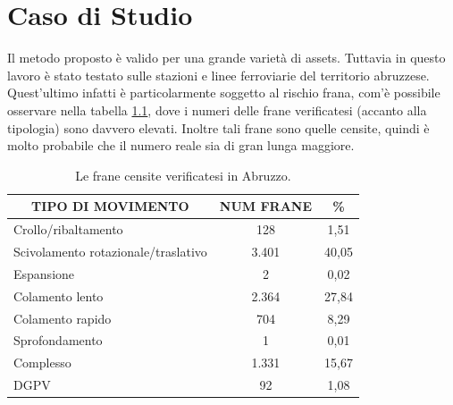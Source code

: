 
\chapter{Caso di Studio} %
Il metodo proposto è valido per una grande varietà di assets. Tuttavia in questo lavoro è stato testato sulle stazioni e linee ferroviarie del territorio abruzzese. Quest'ultimo infatti è particolarmente soggetto al rischio frana, com'è possibile osservare nella tabella \ref{tab:riassunto_frane}, dove i numeri delle frane verificatesi (accanto alla tipologia) sono davvero elevati. Inoltre tali frane sono quelle censite, quindi è molto probabile che il numero reale sia di gran lunga maggiore.

\begin{table}[h]
	\centering
	\caption{Le frane censite verificatesi in Abruzzo.}
	\label{tab:riassunto_frane}
	\begin{tabular}{|l|c|c|}
		\hline
		\multicolumn{1}{|c|}{\cellcolor{gray!50} \textbf{TIPO DI MOVIMENTO}} & {\cellcolor{gray!50}\textbf{NUM FRANE}} & {\cellcolor{gray!50} \textbf{\%}} \\ \hline
		Crollo/ribaltamento & 128  & 1,51   \\ \hline
		Scivolamento rotazionale/traslativo  & 3.401  & 40,05                              \\ \hline
		Espansione                                                                                      & 2                                        & 0,02                               \\ \hline
		Colamento lento                                                                                 & 2.364                                    & 27,84                              \\ \hline
		Colamento rapido                                                                                & 704                                      & 8,29                               \\ \hline
		Sprofondamento                                                                                  & 1                                        & 0,01                               \\ \hline
		Complesso                                                                                       & 1.331                                    & 15,67                              \\ \hline
		DGPV                                                                                            & 92                                       & 1,08                               \\ \hline

\end{tabular}
\end{table}
